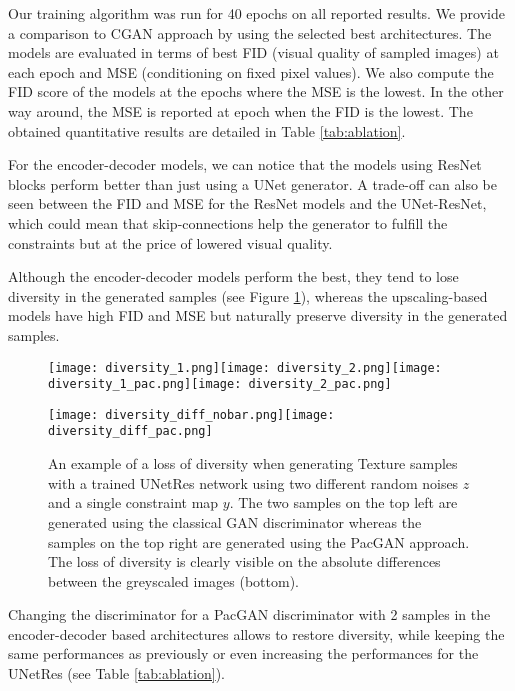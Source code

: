 Our training algorithm was run for 40 epochs on all reported results. We provide a comparison to CGAN\cite{mirza2014} approach by using the selected best architectures.
The models are evaluated in terms of best FID (visual quality of sampled images) at each epoch and MSE (conditioning on fixed pixel values).  We also compute the FID score of the models at the epochs where the MSE is the lowest. In the other way around, the MSE is reported at epoch when the FID is the lowest. The obtained quantitative results are detailed in Table \ref{tab:ablation}.

For the encoder-decoder models, we can notice that the models using ResNet blocks perform better than just using a UNet generator. A trade-off can also be seen between the FID and MSE for the ResNet models and the UNet-ResNet, which could mean that skip-connections help the generator to fulfill the constraints but at the price of lowered visual quality.

Although the encoder-decoder models perform the best, they tend to lose diversity in the generated samples (see Figure \ref{fig:diversity_loss}), whereas the upscaling-based models have high FID and MSE but naturally preserve diversity in the generated samples.

\begin{figure}
	\centering
	\texttt{[image: diversity\_1.png]}\hspace{0.5cm}\texttt{[image: diversity\_2.png]}\hspace{0.5cm}\texttt{[image: diversity\_1\_pac.png]}\hspace{0.5cm}\texttt{[image: diversity\_2\_pac.png]}
	
	\vspace{0.3cm}
	\texttt{[image: diversity\_diff\_nobar.png]}\hspace{0.5cm}\texttt{[image: diversity\_diff\_pac.png]}
	\caption{An example of a loss of diversity when generating Texture samples with a trained UNetRes network using two different random noises $z$ and a single constraint map $y$. The two samples on the top left are generated using the classical GAN discriminator whereas the samples on the top right are generated using the PacGAN approach. The loss of diversity is clearly visible on the absolute differences between the greyscaled images (bottom).}
	\label{fig:diversity_loss}
\end{figure}

Changing the discriminator for a PacGAN discriminator with 2 samples in the encoder-decoder based architectures allows to restore diversity, while keeping the same performances as previously or even increasing the performances for the UNetRes (see Table \ref{tab:ablation}).

